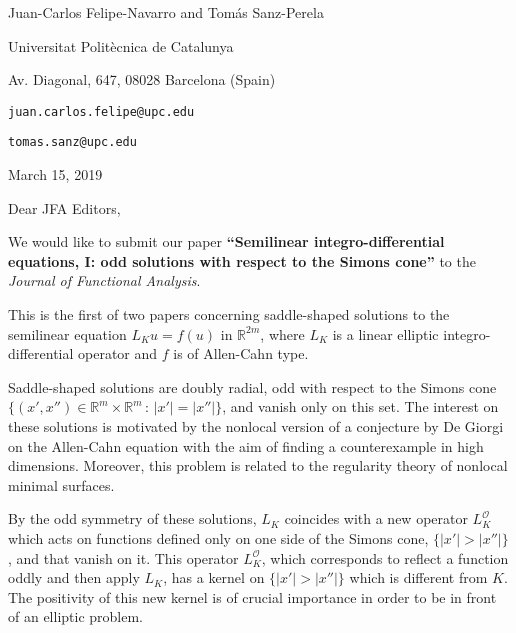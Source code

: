 \documentclass[11pt]{article}
\begin{document}
	

\vspace{-2cm}

\begin{flushright}
Juan-Carlos Felipe-Navarro and Tomás Sanz-Perela

\medskip

Universitat Politècnica de Catalunya 

Av. Diagonal, 647, 08028 Barcelona (Spain)

\nolinkurl{juan.carlos.felipe@upc.edu}

\nolinkurl{tomas.sanz@upc.edu}

\bigskip

March 15, 2019

\end{flushright}

\medskip


Dear JFA Editors,

\medskip

We would like to submit our paper \textbf{``Semilinear integro-differential equations, I: odd solutions with respect to the Simons cone''} to the \textit{Journal of Functional Analysis}.

\medskip

This is the first of two papers concerning saddle-shaped solutions to the semilinear equation $L_K u = f(u)$ in $\mathbb{R}^{2m}$, where $L_K$ is a linear elliptic integro-differential operator and $f$ is of Allen-Cahn type.

\medskip

Saddle-shaped solutions are doubly radial, odd with respect to the Simons cone $\{(x', x'') \in \mathbb{R}^m \times \mathbb{R}^m \, : \, |x'| = |x''|\}$, and vanish only on this set. The interest on these solutions is motivated by the nonlocal version of a conjecture by De Giorgi on the Allen-Cahn equation with the aim of finding a counterexample in high dimensions. Moreover, this problem is related to the regularity theory of nonlocal minimal surfaces. 

\medskip

By the odd symmetry of these solutions, $L_K$ coincides with a new operator $L_K^\mathcal{O}$ which acts on functions defined only on one side of the Simons cone, $\{|x'|>|x''|\}$, and that vanish on it. This operator $L_K^\mathcal{O}$, which corresponds to reflect a function oddly and then apply $L_K$, has a kernel on $\{|x'|>|x''|\}$ which is different from $K$. The positivity of this new kernel is of crucial importance in order to be in front of an elliptic problem.
\end{document}
